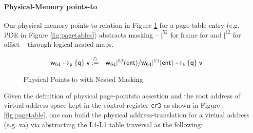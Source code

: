 \paragraph{Physical-Memory points-to} Our physical memory points-to relation in Figure \ref{fig:physicalpointsto} for a page table entry (e.g. \textsf{PDE} in Figure \ref{fig:pagetables}) abstracts masking -- $|^{52}$ for frame for and $|^{12}$ for offset -- through logical nested maps.  
\begin{figure}[!ht]
\[
\begin{array}{cl}
\mathsf{w}_{64}\mapsto_{\mathsf{p}}\{\mathsf{q}\}\;\mathsf{v} \stackrel{{\triangle}}{:=} & \mathsf{w}_{64}|^{52}(\textsf{ent}) / \mathsf{w}_{64}|^{12}(\textsf{ent}) \mapsto_{\mathsf{a}}\{\mathsf{q}\}\;\mathsf{v}
\end{array}
\]
\caption{Physical Points-to with Nested Masking}
  \label{fig:physicalpointsto}
\end{figure}
Given the definition of physical page-pointsto assertion and the root address of virtual-address space kept in the control register \lstinline{cr3} as shown in Figure \ref{fig:pagetable},  one can build the physical address-translation for a virtual address (e.g. \textsf{va}) via abstracting the L4-L1 table traversal as the following:
